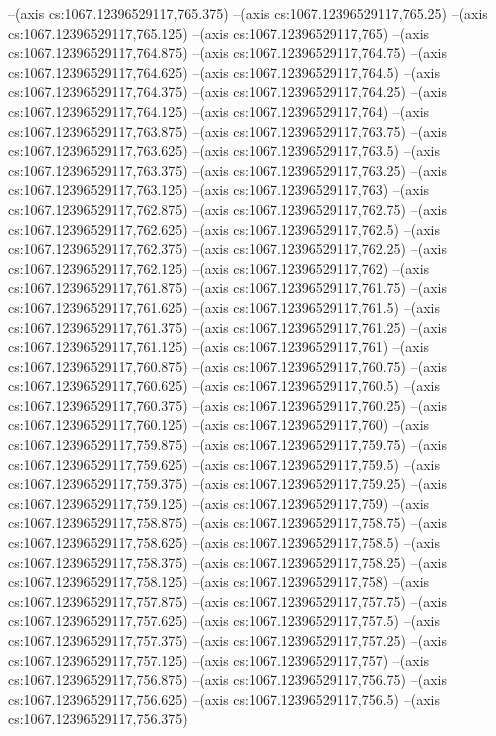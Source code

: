 --(axis cs:1067.12396529117,765.375)
--(axis cs:1067.12396529117,765.25)
--(axis cs:1067.12396529117,765.125)
--(axis cs:1067.12396529117,765)
--(axis cs:1067.12396529117,764.875)
--(axis cs:1067.12396529117,764.75)
--(axis cs:1067.12396529117,764.625)
--(axis cs:1067.12396529117,764.5)
--(axis cs:1067.12396529117,764.375)
--(axis cs:1067.12396529117,764.25)
--(axis cs:1067.12396529117,764.125)
--(axis cs:1067.12396529117,764)
--(axis cs:1067.12396529117,763.875)
--(axis cs:1067.12396529117,763.75)
--(axis cs:1067.12396529117,763.625)
--(axis cs:1067.12396529117,763.5)
--(axis cs:1067.12396529117,763.375)
--(axis cs:1067.12396529117,763.25)
--(axis cs:1067.12396529117,763.125)
--(axis cs:1067.12396529117,763)
--(axis cs:1067.12396529117,762.875)
--(axis cs:1067.12396529117,762.75)
--(axis cs:1067.12396529117,762.625)
--(axis cs:1067.12396529117,762.5)
--(axis cs:1067.12396529117,762.375)
--(axis cs:1067.12396529117,762.25)
--(axis cs:1067.12396529117,762.125)
--(axis cs:1067.12396529117,762)
--(axis cs:1067.12396529117,761.875)
--(axis cs:1067.12396529117,761.75)
--(axis cs:1067.12396529117,761.625)
--(axis cs:1067.12396529117,761.5)
--(axis cs:1067.12396529117,761.375)
--(axis cs:1067.12396529117,761.25)
--(axis cs:1067.12396529117,761.125)
--(axis cs:1067.12396529117,761)
--(axis cs:1067.12396529117,760.875)
--(axis cs:1067.12396529117,760.75)
--(axis cs:1067.12396529117,760.625)
--(axis cs:1067.12396529117,760.5)
--(axis cs:1067.12396529117,760.375)
--(axis cs:1067.12396529117,760.25)
--(axis cs:1067.12396529117,760.125)
--(axis cs:1067.12396529117,760)
--(axis cs:1067.12396529117,759.875)
--(axis cs:1067.12396529117,759.75)
--(axis cs:1067.12396529117,759.625)
--(axis cs:1067.12396529117,759.5)
--(axis cs:1067.12396529117,759.375)
--(axis cs:1067.12396529117,759.25)
--(axis cs:1067.12396529117,759.125)
--(axis cs:1067.12396529117,759)
--(axis cs:1067.12396529117,758.875)
--(axis cs:1067.12396529117,758.75)
--(axis cs:1067.12396529117,758.625)
--(axis cs:1067.12396529117,758.5)
--(axis cs:1067.12396529117,758.375)
--(axis cs:1067.12396529117,758.25)
--(axis cs:1067.12396529117,758.125)
--(axis cs:1067.12396529117,758)
--(axis cs:1067.12396529117,757.875)
--(axis cs:1067.12396529117,757.75)
--(axis cs:1067.12396529117,757.625)
--(axis cs:1067.12396529117,757.5)
--(axis cs:1067.12396529117,757.375)
--(axis cs:1067.12396529117,757.25)
--(axis cs:1067.12396529117,757.125)
--(axis cs:1067.12396529117,757)
--(axis cs:1067.12396529117,756.875)
--(axis cs:1067.12396529117,756.75)
--(axis cs:1067.12396529117,756.625)
--(axis cs:1067.12396529117,756.5)
--(axis cs:1067.12396529117,756.375)

